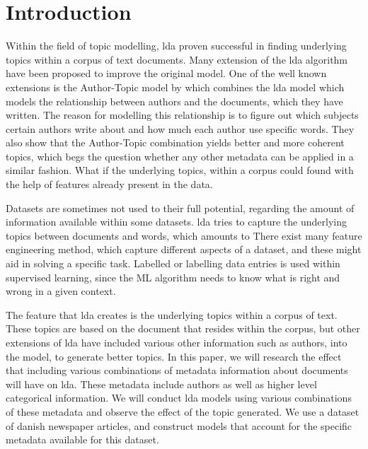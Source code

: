 \section{Introduction}\label{sec:introduction}

Within the field of topic modelling, \Gls{lda} proven successful in finding underlying topics within a corpus of text documents.
Many extension of the \gls{lda} algorithm have been proposed to improve the original model.
One of the well known extensions is the Author-Topic model by \citet{author_topic} which combines the \gls{lda} model which models the relationship between authors and the documents, which they have written.
The reason for modelling this relationship is to figure out which subjects certain authors write about and how much each author use specific words. 
They also show that the Author-Topic combination yields better and more coherent topics, which begs the question whether any other metadata can be applied in a similar fashion.
What if the underlying topics, within a corpus could found with the help of features already present in the data.

Datasets are sometimes not used to their full potential, regarding the amount of information available within some datasets.
\gls{lda} tries to capture the underlying topics between documents and words, which amounts to 
There exist many feature engineering method, which capture different aspects of a dataset, and these might aid in solving a specific task.
Labelled or labelling data entries is used within supervised learning, since the \gls{ML} algorithm needs to know what is right and wrong in a given context.

The feature that \gls{lda} creates is the underlying topics within a corpus of text.
These topics are based on the document that resides within the corpus, but other extensions of \gls{lda} have included various other information such as authors, into the model, to generate better topics.
In this paper, we will research the effect that including various combinations of metadata information about documents will have on \gls{lda}.
These metadata include authors as well as higher level categorical information.
We will conduct \gls{lda} models using various combinations of these metadata and observe the effect of the topic generated.
We use a dataset of danish newspaper articles, and construct models that account for the specific metadata available for this dataset.